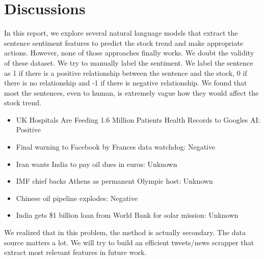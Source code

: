 \documentclass[11pt,a4paper]{article}
\begin{document}
\section{Discussions}
In this report, we explore several natural language models that extract the sentence sentiment features to predict the stock trend and make appropriate actions. However, none of those approaches finally works. We doubt the validity of these dataset. We try to manually label the sentiment. We label the sentence as 1 if there is a positive relationship between the sentence and the stock, 0 if there is no relationship and -1 if there is negative relationship. We found that most the sentences, even to human, is extremely vague how they would affect the stock trend.
\begin{itemize}
  \item UK Hospitals Are Feeding 1.6 Million Patients Health Records to Googles AI: Positive
  \item Final warning to Facebook by Frances data watchdog: Negative
  \item Iran wants India to pay oil dues in euros: Unknown
  \item IMF chief backs Athens as permanent Olympic host: Unknown
  \item Chinese oil pipeline explodes: Negative
  \item India gets \$1 billion loan from World Bank for solar mission: Unknown
\end{itemize}
We realized that in this problem, the method is actually secondary. The data source matters a lot. We will try to build an efficient tweets/news scrapper that extract most relevant features in future work.




%
\end{document}
